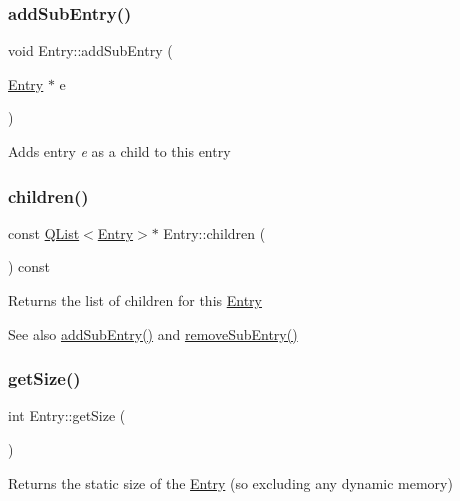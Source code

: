 \subsubsection{\texorpdfstring{addSubEntry()}{addSubEntry()}}
{\footnotesize\ttfamily void Entry\+::add\+Sub\+Entry (\begin{DoxyParamCaption}\item[{\mbox{\hyperlink{class_entry}{Entry}} $\ast$}]{e }\end{DoxyParamCaption})}

Adds entry {\itshape e} as a child to this entry \mbox{\label{class_entry_a1ede1a1bcb62ce21781fe86e8d3c5ddc}} 
\subsubsection{\texorpdfstring{children()}{children()}}
{\footnotesize\ttfamily const \mbox{\hyperlink{class_q_list}{Q\+List}}$<$\mbox{\hyperlink{class_entry}{Entry}}$>$$\ast$ Entry\+::children (\begin{DoxyParamCaption}{ }\end{DoxyParamCaption}) const\hspace{0.3cm}{\ttfamily [inline]}}

Returns the list of children for this \mbox{\hyperlink{class_entry}{Entry}} \begin{DoxySeeAlso}{See also}
\mbox{\hyperlink{class_entry_a8c8479030e7a983413308cd412a926ff}{add\+Sub\+Entry()}} and \mbox{\hyperlink{class_entry_aecaae1b0c184b1ee2dc342ce7d6300f1}{remove\+Sub\+Entry()}} 
\end{DoxySeeAlso}
\mbox{\label{class_entry_af8a7c9072149622cf62be17fc0bc9ec9}} 
\subsubsection{\texorpdfstring{getSize()}{getSize()}}
{\footnotesize\ttfamily int Entry\+::get\+Size (\begin{DoxyParamCaption}{ }\end{DoxyParamCaption})}

Returns the static size of the \mbox{\hyperlink{class_entry}{Entry}} (so excluding any dynamic memory) \mbox{\label{class_entry_a902c34351fc9978dfe5530804827ceb6}} 

